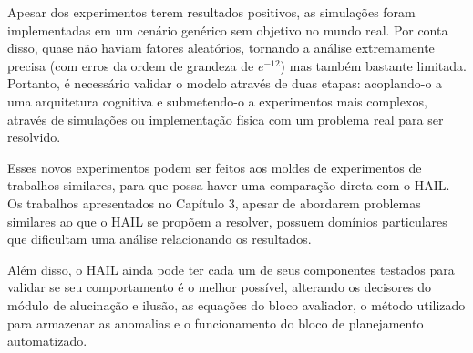 Apesar dos experimentos terem resultados positivos, as simulações foram implementadas em um cenário genérico sem objetivo no mundo real. Por conta disso, quase não haviam fatores aleatórios, tornando a análise extremamente precisa (com erros da ordem de grandeza de $e^{-12}$) mas também bastante limitada.
Portanto, é necessário validar o modelo através de duas etapas: acoplando-o a uma arquitetura cognitiva e submetendo-o a experimentos mais complexos, através de simulações ou implementação física com um problema real para ser resolvido.

Esses novos experimentos podem ser feitos aos moldes de experimentos de trabalhos similares, para que possa haver uma comparação direta com o HAIL. Os trabalhos apresentados no Capítulo 3, apesar de abordarem problemas similares ao que o HAIL se propõem a resolver, possuem domínios particulares que dificultam uma análise relacionando os resultados.

Além disso, o HAIL ainda pode ter cada um de seus componentes testados para validar se seu comportamento é o melhor possível, alterando os decisores do módulo de alucinação e ilusão, as equações do bloco avaliador, o método utilizado para armazenar as anomalias e o funcionamento do bloco de planejamento automatizado.